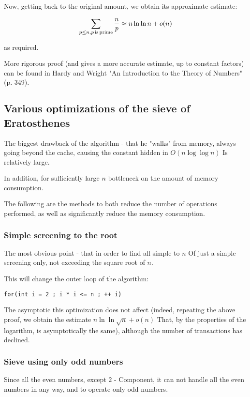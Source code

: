 Now, getting back to the original amount, we obtain its approximate estimate:

$$\sum_{p\leq n,p{\rm \, is\, prime}}\frac{n}{p}\approx n\ln\ln n+o(n)$$

as required.

More rigorous proof (and gives a more accurate estimate, up to constant factors) can be found in Hardy and Wright "An Introduction to the Theory of Numbers" (p. 349).

\subsection{ Various optimizations of the sieve of Eratosthenes }

The biggest drawback of the algorithm - that he "walks" from memory, always going beyond the cache, causing the constant hidden in $O (n \log \log n)$ Is relatively large.

In addition, for sufficiently large $n$ bottleneck on the amount of memory consumption.

The following are the methods to both reduce the number of operations performed, as well as significantly reduce the memory consumption.

\subsubsection{ Simple screening to the root }

The most obvious point - that in order to find all simple to $n$ Of just a simple screening only, not exceeding the square root of $n$.

This will change the outer loop of the algorithm:

\begin{verbatim}
for(int i = 2 ; i * i <= n ; ++ i)
\end{verbatim}
The asymptotic this optimization does not affect (indeed, repeating the above proof, we obtain the estimate $n \ln \ln \sqrt {n} + o (n)$ That, by the properties of the logarithm, is asymptotically the same), although the number of transactions has declined.

\subsubsection{ Sieve using only odd numbers }

Since all the even numbers, except $2$ - Component, it can not handle all the even numbers in any way, and to operate only odd numbers.

